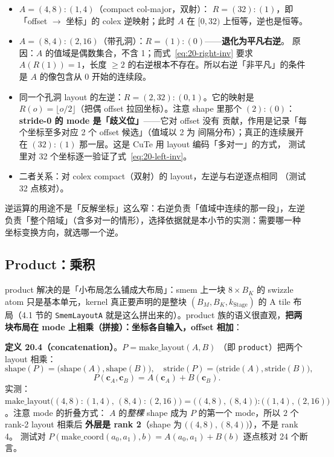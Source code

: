 \begin{itemize}
  \item $A=(4,8){:}(1,4)$（compact col-major，双射）：
        $R=(32){:}(1)$，即「offset $\to$ 坐标」的 colex 逆映射；此时
        $A$ 在 $[0,32)$ 上恒等，逆也是恒等。
  \item $A=(8,4){:}(2,16)$（带孔洞）：$R=(1){:}(0)$——\textbf{退化为平凡右逆}。
        原因：$A$ 的值域是偶数集合，不含 1；而式~\eqref{eq:20-right-inv} 要求
        $A(R(1))=1$，长度 $\ge2$ 的右逆根本不存在。所以右逆「非平凡」的条件是
        $A$ 的像包含从 0 开始的连续段。
  \item 同一个孔洞 layout 的左逆：$R=(2,32){:}(0,1)$。它的映射是
        $R(o)=\lfloor o/2\rfloor$（把偶 offset 拉回坐标）。注意 shape 里那个
        $(2){:}(0)$：\textbf{stride-0 的 mode 是「歧义位」}——它对 offset 没有
        贡献，作用是记录「每个坐标至多对应 2 个 offset 候选」（值域以 2 为
        间隔分布）；真正的连续展开在 $(32){:}(1)$ 那一层。这是 CuTe 用
        layout 编码「多对一」的方式，
        测试里对 32 个坐标逐一验证了式~\eqref{eq:20-left-inv}。
  \item 二者关系：对 colex compact（双射）的 layout，左逆与右逆逐点相同
        （测试 32 点核对）。
\end{itemize}

逆运算的用途不是「反解坐标」这么窄：右逆负责「值域中连续的那一段」，左逆
负责「整个陪域」（含多对一的情形），选择依据就是本小节的实测：需要哪一种
坐标变换方向，就选哪一个逆。

\subsection{Product：乘积}

product 解决的是「小布局怎么铺成大布局」：smem 上一块 $8\times B_K$ 的
swizzle atom 只是基本单元，kernel 真正要声明的是整块
$(B_M,B_K,k_{\mathrm{Stage}})$ 的 A tile 布局（4.1 节的 \texttt{SmemLayoutA}
就是这么拼出来的）。product 族的语义很直观，\textbf{把两块布局在 mode
上相乘（拼接）：坐标各自输入，offset 相加}：

\textbf{定义 20.4（concatenation）}。$P=\mathrm{make\_layout}(A,B)$
（即 \texttt{product}）把两个 layout 相乘：
\begin{equation}
  \mathrm{shape}(P)=\bigl(\mathrm{shape}(A),\mathrm{shape}(B)\bigr),\quad
  \mathrm{stride}(P)=\bigl(\mathrm{stride}(A),\mathrm{stride}(B)\bigr),
  \label{eq:20-product-shape}
\end{equation}
\begin{equation}
  P(\mathbf{c}_A,\mathbf{c}_B) = A(\mathbf{c}_A) + B(\mathbf{c}_B) .
  \label{eq:20-product}
\end{equation}
实测：$\mathrm{make\_layout}\bigl((4,8){:}(1,4),\,(8,4){:}(2,16)\bigr)
= \bigl((4,8),(8,4)\bigr){:}\bigl((1,4),(2,16)\bigr)$。注意 mode 的折叠方式：
$A$ 的\emph{整棵} shape 成为 $P$ 的第一个 mode，所以 $2$ 个 rank-2 layout 相乘后
\textbf{外层是 rank 2}（shape 为 $\bigl((4,8),(8,4)\bigr)$），不是 rank 4。
测试对 $P(\mathrm{make\_coord}(a_0,a_1),b)=A(a_0,a_1)+B(b)$ 逐点核对 24 个断言。

